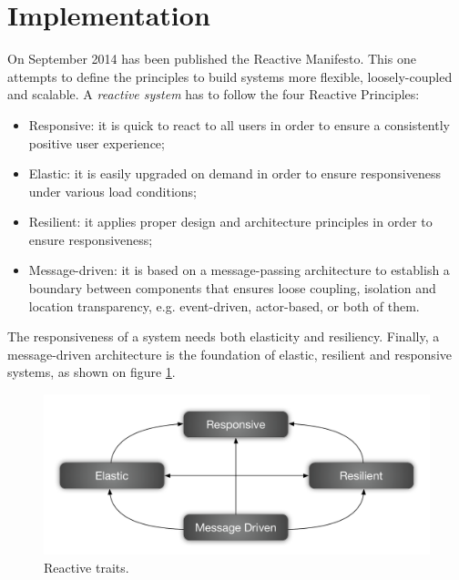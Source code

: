 \section{Implementation}
\label{sec:implementation}


On September 2014 has been published the Reactive Manifesto\cite{reactivemanifesto}.
This one attempts to define the principles to build systems more flexible, loosely-coupled and scalable.
A \textit{reactive system} has to follow the four Reactive Principles:

\begin{itemize}
  \item Responsive: it is quick to react to all users in order to ensure a consistently positive user experience;
  \item Elastic: it is easily upgraded on demand in order to ensure responsiveness under various load conditions;
  \item Resilient: it applies proper design and architecture principles in order to ensure responsiveness;
  \item Message-driven: it is based on a message-passing architecture to establish a boundary between components that ensures loose coupling, isolation and location transparency, e.g. event-driven, actor-based, or both of them.
\end{itemize}

The responsiveness of a system needs both elasticity and resiliency.
Finally, a message-driven architecture is the foundation of elastic, resilient and responsive systems, as shown on figure \ref{fig:reactive-traits}.

\begin{figure}[t!]
  \centering
  \includegraphics[width=.99\linewidth]{images/reactive-traits}
  \caption{Reactive traits.}
  \label{fig:reactive-traits}
\end{figure}



